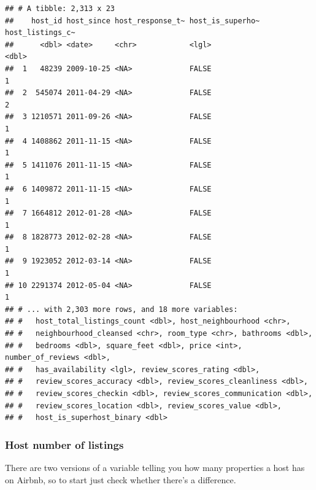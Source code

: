\documentclass[
]{book}
\newenvironment{Shaded}{\begin{snugshade}}{\end{snugshade}}
\newcommand{\DataTypeTok}[1]{\textcolor[rgb]{0.13,0.29,0.53}{#1}}
\newcommand{\DecValTok}[1]{\textcolor[rgb]{0.00,0.00,0.81}{#1}}
\newcommand{\KeywordTok}[1]{\textcolor[rgb]{0.13,0.29,0.53}{\textbf{#1}}}
\newcommand{\NormalTok}[1]{#1}
\newcommand{\OperatorTok}[1]{\textcolor[rgb]{0.81,0.36,0.00}{\textbf{#1}}}
\newcommand{\StringTok}[1]{\textcolor[rgb]{0.31,0.60,0.02}{#1}}
\begin{document}
\begin{verbatim}
## # A tibble: 2,313 x 23
##    host_id host_since host_response_t~ host_is_superho~ host_listings_c~
##      <dbl> <date>     <chr>            <lgl>                       <dbl>
##  1   48239 2009-10-25 <NA>             FALSE                           1
##  2  545074 2011-04-29 <NA>             FALSE                           2
##  3 1210571 2011-09-26 <NA>             FALSE                           1
##  4 1408862 2011-11-15 <NA>             FALSE                           1
##  5 1411076 2011-11-15 <NA>             FALSE                           1
##  6 1409872 2011-11-15 <NA>             FALSE                           1
##  7 1664812 2012-01-28 <NA>             FALSE                           1
##  8 1828773 2012-02-28 <NA>             FALSE                           1
##  9 1923052 2012-03-14 <NA>             FALSE                           1
## 10 2291374 2012-05-04 <NA>             FALSE                           1
## # ... with 2,303 more rows, and 18 more variables:
## #   host_total_listings_count <dbl>, host_neighbourhood <chr>,
## #   neighbourhood_cleansed <chr>, room_type <chr>, bathrooms <dbl>,
## #   bedrooms <dbl>, square_feet <dbl>, price <int>, number_of_reviews <dbl>,
## #   has_availability <lgl>, review_scores_rating <dbl>,
## #   review_scores_accuracy <dbl>, review_scores_cleanliness <dbl>,
## #   review_scores_checkin <dbl>, review_scores_communication <dbl>,
## #   review_scores_location <dbl>, review_scores_value <dbl>,
## #   host_is_superhost_binary <dbl>
\end{verbatim}

\hypertarget{host-number-of-listings}{%
\subsubsection{Host number of listings}\label{host-number-of-listings}}

There are two versions of a variable telling you how many properties a host has on Airbnb, so to start just check whether there's a difference.

\begin{Shaded}
\end{Shaded}
\end{document}
